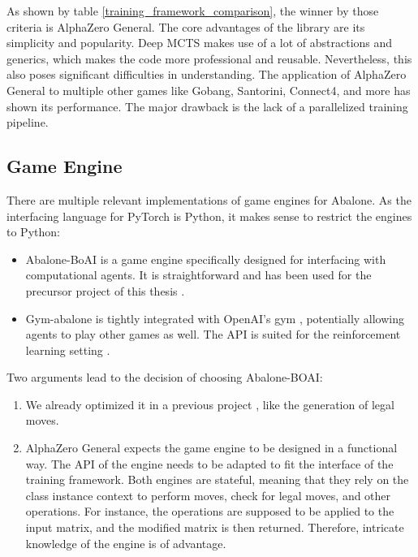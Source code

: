 As shown by table \ref{training_framework_comparison}, the winner by those criteria is AlphaZero General. The core advantages of the library are its simplicity and popularity. Deep MCTS makes use of a lot of abstractions and generics, which makes the code more professional and reusable. Nevertheless, this also poses significant difficulties in understanding. The application of AlphaZero General to multiple other games like Gobang, Santorini, Connect4, and more has shown its performance. The major drawback is the lack of a parallelized training pipeline.

\subsection{Game Engine}
There are multiple relevant implementations of game engines for Abalone. As the interfacing language for PyTorch is Python, it makes sense to restrict the engines to Python:

\begin{itemize}
    \item Abalone-BoAI is a game engine specifically designed for interfacing with computational agents. It is straightforward and has been used for the precursor project of this thesis \cite{scriptim_scriptimabalone-boai_2021}.
    \item Gym-abalone is tightly integrated with OpenAI's gym \cite{openai_gym_nodate}, potentially allowing agents to play other games as well. The API is suited for the reinforcement learning setting \cite{towzeur_towzeurgym-abalone_2021}.
\end{itemize}

Two arguments lead to the decision of choosing Abalone-BOAI:
\begin{enumerate}
    \item We already optimized it in a previous project \cite{claussen_abalone_2021}, like the generation of legal moves.
    \item AlphaZero General expects the game engine to be designed in a functional way. The API of the engine needs to be adapted to fit the interface of the training framework. Both engines are stateful, meaning that they rely on the class instance context to perform moves, check for legal moves, and other operations. For instance, the operations are supposed to be applied to the input matrix, and the modified matrix is then returned. Therefore, intricate knowledge of the engine is of advantage.
\end{enumerate}

